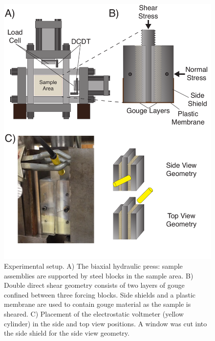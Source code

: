 \begin{figure}
\includegraphics[width=30pc]{chap_electrical/biax_setup.pdf}
\caption{Experimental setup. A) The biaxial hydraulic press: sample assemblies are supported by steel blocks in the sample area. B) Double direct shear geometry consists of two layers of gouge confined between three forcing blocks.  Side shields and a plastic membrane are used to contain gouge material as the sample is sheared. C) Placement of the electrostatic voltmeter (yellow cylinder) in the side and top view positions.  A window was cut into the side shield for the side view geometry. }
\label{biax_setup}
\end{figure}

\clearpage

